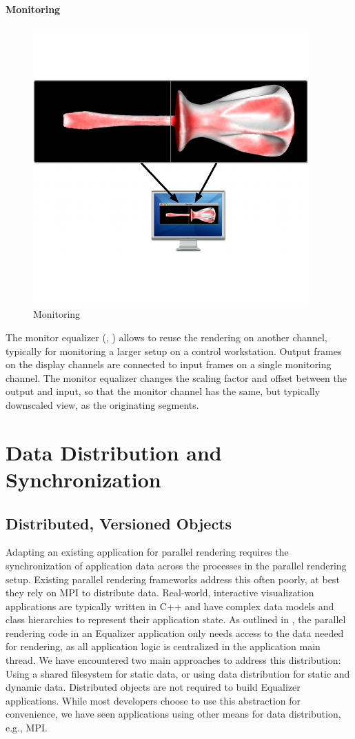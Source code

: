 \subsubsection{Monitoring}

\begin{figure}
  \includegraphics[width=.382\textwidth]{images/monitoreq}
  \caption{\label{fmonitor}Monitoring}
\end{figure}
The monitor equalizer (, ) allows to reuse the
rendering on another channel, typically for monitoring a larger setup on a
control workstation. Output frames on the display channels are connected to
input frames on a single monitoring channel. The monitor equalizer changes the
scaling factor and offset between the output and input, so that the monitor
channel has the same, but typically downscaled view, as the originating
segments.


\chapter{Data Distribution and Synchronization}


\section{Distributed, Versioned Objects}

Adapting an existing application for parallel rendering requires the
synchronization of application data across the processes in the parallel
rendering setup. Existing parallel rendering frameworks address this often
poorly, at best they rely on MPI to distribute data. Real-world, interactive
visualization applications are typically written in C++ and have complex data
models and class hierarchies to represent their application state. As outlined
in \cite{EMP:09}, the parallel rendering code in an \textsf{Equalizer}
application only needs access to the data needed for rendering, as all
application logic is centralized in the application main thread. We have
encountered two main approaches to address this distribution: Using a shared
filesystem for static data, or using data distribution for static and dynamic
data. Distributed objects are not required to build \textsf{Equalizer}
applications. While most developers choose to use this abstraction for
convenience, we have seen applications using other means for data distribution,
e.g., MPI.

